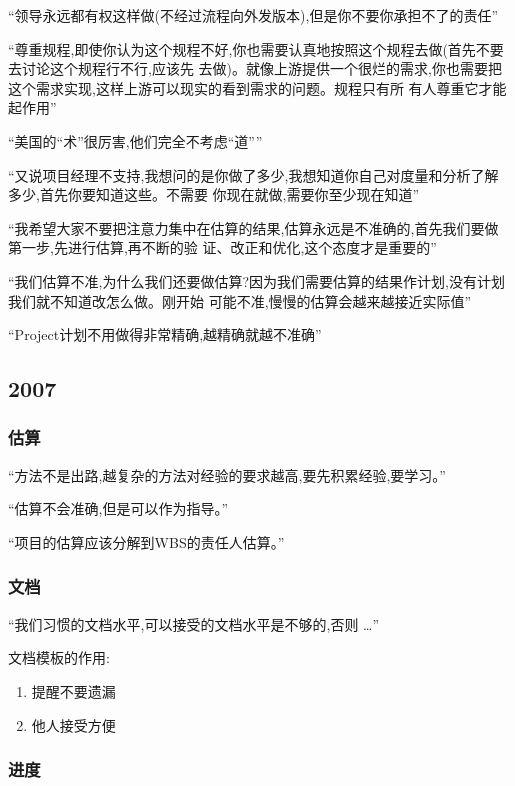 \documentclass[11pt]{article}
\begin{document}
``领导永远都有权这样做(不经过流程向外发版本),但是你不要你承担不了的责任''

``尊重规程,即使你认为这个规程不好,你也需要认真地按照这个规程去做(首先不要去讨论这个规程行不行,应该先
去做)。就像上游提供一个很烂的需求,你也需要把这个需求实现,这样上游可以现实的看到需求的问题。规程只有所
有人尊重它才能起作用''

``美国的``术''很厉害,他们完全不考虑``道''''

``又说项目经理不支持,我想问的是你做了多少,我想知道你自己对度量和分析了解多少,首先你要知道这些。不需要
你现在就做,需要你至少现在知道''

``我希望大家不要把注意力集中在估算的结果,估算永远是不准确的,首先我们要做第一步,先进行估算,再不断的验
证、改正和优化,这个态度才是重要的''

``我们估算不准,为什么我们还要做估算?因为我们需要估算的结果作计划,没有计划我们就不知道改怎么做。刚开始
可能不准,慢慢的估算会越来越接近实际值''

``Project计划不用做得非常精确,越精确就越不准确''

\subsection{2007}

\subsubsection{估算}

``方法不是出路,越复杂的方法对经验的要求越高,要先积累经验,要学习。''

``估算不会准确,但是可以作为指导。''

``项目的估算应该分解到WBS的责任人估算。''

\subsubsection{文档}

``我们习惯的文档水平,可以接受的文档水平是不够的,否则 \ldots ''

文档模板的作用:
\begin{enumerate}
 \item 提醒不要遗漏
 \item 他人接受方便
\end{enumerate}

\subsubsection{进度}
\end{document}
